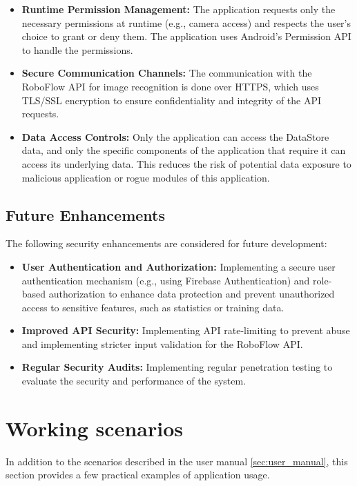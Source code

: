 \begin{itemize}
    \item \textbf{Runtime Permission Management:} The application requests only the necessary permissions at runtime (e.g., camera access) and respects the user's choice to grant or deny them. The application uses Android's Permission API to handle the permissions.
    \item \textbf{Secure Communication Channels:} The communication with the RoboFlow API for image recognition is done over HTTPS, which uses TLS/SSL encryption to ensure confidentiality and integrity of the API requests.
     \item \textbf{Data Access Controls:} Only the application can access the DataStore data, and only the specific components of the application that require it can access its underlying data. This reduces the risk of potential data exposure to malicious application or rogue modules of this application.
\end{itemize}

\subsection{Future Enhancements}

The following security enhancements are considered for future development:

\begin{itemize}
    \item \textbf{User Authentication and Authorization:}  Implementing a secure user authentication mechanism (e.g., using Firebase Authentication) and role-based authorization to enhance data protection and prevent unauthorized access to sensitive features, such as statistics or training data.
    \item \textbf{Improved API Security:} Implementing API rate-limiting to prevent abuse and implementing stricter input validation for the RoboFlow API.
     \item \textbf{Regular Security Audits:} Implementing regular penetration testing to evaluate the security and performance of the system.
\end{itemize}

\section{Working scenarios}

In addition to the scenarios described in the user manual \ref{sec:user_manual}, this section provides a few practical examples of application usage.

